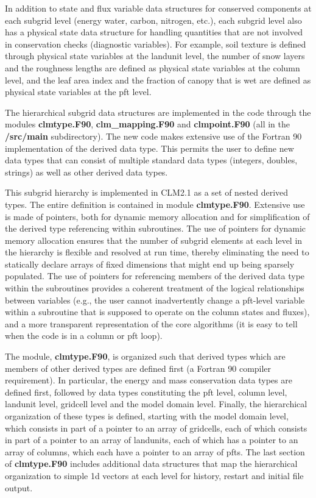 In addition to state and flux variable data structures for conserved
components at each subgrid level (energy water, carbon, nitrogen,
etc.), each subgrid level also has a physical state data structure for
handling quantities that are not involved in conservation checks
(diagnostic variables).  For example, soil texture is defined through
physical state variables at the landunit level, the number of snow
layers and the roughness lengths are defined as physical state
variables at the column level, and the leaf area index and the
fraction of canopy that is wet are defined as physical state variables
at the pft level.

The hierarchical subgrid data structures are implemented in the code
through the modules {\bf clmtype.F90}, {\bf clm\_mapping.F90} and {\bf
clmpoint.F90} (all in the {\bf /src/main} subdirectory). The new code
makes extensive use of the Fortran 90 implementation of the derived
data type.  This permits the user to define new data types that can
consist of multiple standard data types (integers, doubles, strings)
as well as other derived data types.

This subgrid hierarchy is implemented in CLM2.1 as a set of nested
derived types.  The entire definition is contained in module {\bf
clmtype.F90}. Extensive use is made of pointers, both for dynamic
memory allocation and for simplification of the derived type
referencing within subroutines.  The use of pointers for dynamic
memory allocation ensures that the number of subgrid elements at each
level in the hierarchy is flexible and resolved at run time, thereby
eliminating the need to statically declare arrays of fixed dimensions
that might end up being sparsely populated.  The use of pointers for
referencing members of the derived data type within the subroutines
provides a coherent treatment of the logical relationships between
variables (e.g., the user cannot inadvertently change a pft-level
variable within a subroutine that is supposed to operate on the column
states and fluxes), and a more transparent representation of the core
algorithms (it is easy to tell when the code is in a column or pft
loop).

The module, {\bf clmtype.F90}, is organized such that derived types
which are members of other derived types are defined first (a Fortran
90 compiler requirement).  In particular, the energy and mass
conservation data types are defined first, followed by data types
constituting the pft level, column level, landunit level, gridcell
level and the model domain level. Finally, the hierarchical
organization of these types is defined, starting with the model domain
level, which consists in part of a pointer to an array of gridcells,
each of which consists in part of a pointer to an array of landunits,
each of which has a pointer to an array of columns, which each have a
pointer to an array of pfts.  The last section of {\bf clmtype.F90}
includes additional data structures that map the hierarchical
organization to simple 1d vectors at each level for history, restart
and initial file output.  

